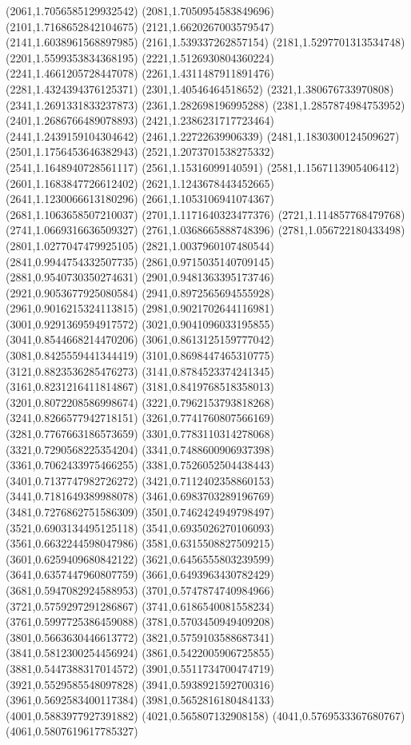 {(2061,1.7056585129932542)
(2081,1.7050954583849696)
(2101,1.7168652842104675)
(2121,1.6620267003579547)
(2141,1.6038961568897985)
(2161,1.539337262857154)
(2181,1.5297701313534748)
(2201,1.5599353834368195)
(2221,1.5126930804360224)
(2241,1.4661205728447078)
(2261,1.4311487911891476)
(2281,1.4324394376125371)
(2301,1.40546464518652)
(2321,1.380676733970808)
(2341,1.2691331833237873)
(2361,1.282698196995288)
(2381,1.2857874984753952)
(2401,1.2686766489078893)
(2421,1.2386231717723464)
(2441,1.2439159104304642)
(2461,1.22722639906339)
(2481,1.1830300124509627)
(2501,1.1756453646382943)
(2521,1.2073701538275332)
(2541,1.1648940728561117)
(2561,1.15316099140591)
(2581,1.1567113905406412)
(2601,1.1683847726612402)
(2621,1.1243678443452665)
(2641,1.1230066613180296)
(2661,1.1053106941074367)
(2681,1.1063658507210037)
(2701,1.1171640323477376)
(2721,1.114857768479768)
(2741,1.0669316636509327)
(2761,1.0368665888748396)
(2781,1.056722180433498)
(2801,1.0277047479925105)
(2821,1.0037960107480544)
(2841,0.9944754332507735)
(2861,0.9715035140709145)
(2881,0.9540730350274631)
(2901,0.9481363395173746)
(2921,0.9053677925080584)
(2941,0.8972565694555928)
(2961,0.9016215324113815)
(2981,0.9021702644116981)
(3001,0.9291369594917572)
(3021,0.9041096033195855)
(3041,0.8544668214470206)
(3061,0.8613125159777042)
(3081,0.8425559441344419)
(3101,0.8698447465310775)
(3121,0.8823536285476273)
(3141,0.8784523374241345)
(3161,0.8231216411814867)
(3181,0.8419768518358013)
(3201,0.8072208586998674)
(3221,0.7962153793818268)
(3241,0.8266577942718151)
(3261,0.7741760807566169)
(3281,0.7767663186573659)
(3301,0.7783110314278068)
(3321,0.7290568225354204)
(3341,0.7488600906937398)
(3361,0.7062433975466255)
(3381,0.7526052504438443)
(3401,0.7137747982726272)
(3421,0.7112402358860153)
(3441,0.7181649389988078)
(3461,0.6983703289196769)
(3481,0.7276862751586309)
(3501,0.7462424949798497)
(3521,0.6903134495125118)
(3541,0.6935026270106093)
(3561,0.6632244598047986)
(3581,0.6315508827509215)
(3601,0.6259409680842122)
(3621,0.6456555803239599)
(3641,0.6357447960807759)
(3661,0.6493963430782429)
(3681,0.5947082924588953)
(3701,0.5747874740984966)
(3721,0.5759297291286867)
(3741,0.6186540081558234)
(3761,0.5997725386459088)
(3781,0.5703450949409208)
(3801,0.5663630446613772)
(3821,0.5759103588687341)
(3841,0.5812300254456924)
(3861,0.5422005906725855)
(3881,0.5447388317014572)
(3901,0.5511734700474719)
(3921,0.5529585548097828)
(3941,0.5938921592700316)
(3961,0.5692583400117384)
(3981,0.5652816180484133)
(4001,0.5883977927391882)
(4021,0.565807132908158)
(4041,0.5769533367680767)
(4061,0.5807619617785327)
}
